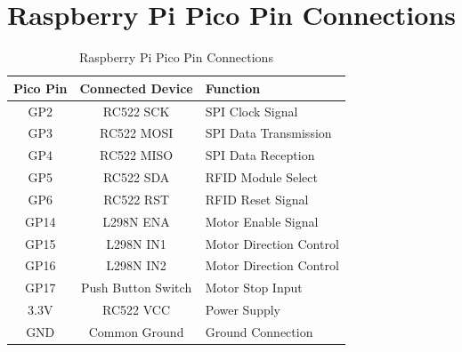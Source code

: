 \documentclass[12pt,a4paper,oneside]{report}
\begin{document}
\section{Raspberry Pi Pico Pin Connections}

\begin{table}[H]
\centering
\renewcommand{\arraystretch}{1.5}

\begin{tabular}{|c|c|p{7cm}|}
\hline

\textbf{Pico Pin} & \textbf{Connected Device} & \textbf{Function} \\

\hline

GP2 & RC522 SCK & SPI Clock Signal \\

\hline

GP3 & RC522 MOSI & SPI Data Transmission \\

\hline

GP4 & RC522 MISO & SPI Data Reception \\

\hline

GP5 & RC522 SDA & RFID Module Select \\

\hline

GP6 & RC522 RST & RFID Reset Signal \\

\hline

GP14 & L298N ENA & Motor Enable Signal \\

\hline

GP15 & L298N IN1 & Motor Direction Control \\

\hline

GP16 & L298N IN2 & Motor Direction Control \\

\hline

GP17 & Push Button Switch & Motor Stop Input \\

\hline

3.3V & RC522 VCC & Power Supply \\

\hline

GND & Common Ground & Ground Connection \\

\hline

\end{tabular}

\caption{Raspberry Pi Pico Pin Connections}

\end{table}
\end{document}
